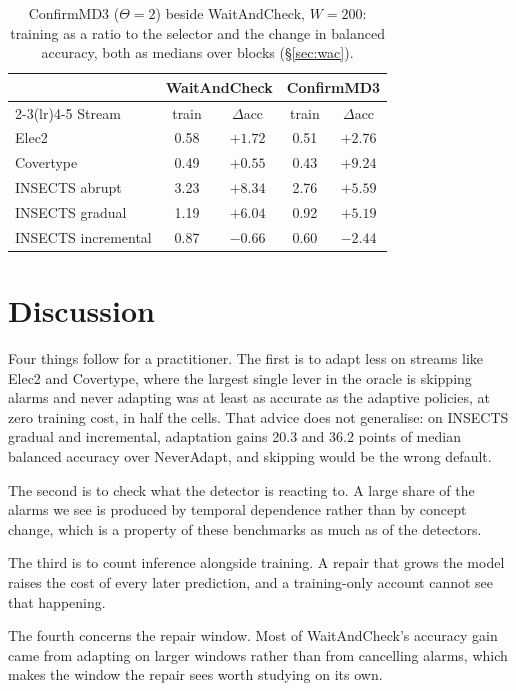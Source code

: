 \documentclass[conference]{IEEEtran}
\begin{document}
\begin{table}[t]
\caption{ConfirmMD3 ($\Theta=2$) beside WaitAndCheck, $W=200$: training as a
ratio to the selector and the change in balanced accuracy, both as medians over
blocks (\S\ref{sec:wac}).}
\label{tab:md3}
\centering\small
\begin{tabular}{lcccc}
\toprule
& \multicolumn{2}{c}{WaitAndCheck} & \multicolumn{2}{c}{ConfirmMD3} \\
\cmidrule(lr){2-3}\cmidrule(lr){4-5}
Stream & train & $\Delta$acc & train & $\Delta$acc \\
\midrule
Elec2 & 0.58 & $+1.72$ & 0.51 & $+2.76$ \\
Covertype & 0.49 & $+0.55$ & 0.43 & $+9.24$ \\
INSECTS abrupt & 3.23 & $+8.34$ & 2.76 & $+5.59$ \\
INSECTS gradual & 1.19 & $+6.04$ & 0.92 & $+5.19$ \\
INSECTS incremental & 0.87 & $-0.66$ & 0.60 & $-2.44$ \\
\bottomrule
\end{tabular}
\end{table}

\section{Discussion}

Four things follow for a practitioner. The first is to adapt less on streams like
Elec2 and Covertype, where the largest single lever in the oracle is skipping
alarms and never adapting was at least as accurate as the adaptive policies, at
zero training cost, in half the cells. That advice does not generalise: on
INSECTS gradual and incremental, adaptation gains 20.3 and 36.2 points of median
balanced accuracy over NeverAdapt, and skipping would be the wrong default.

The second is to check what the detector is reacting to. A large share of the
alarms we see is produced by temporal dependence rather than by concept change,
which is a property of these benchmarks as much as of the detectors.

The third is to count inference alongside training. A repair that grows the model
raises the cost of every later prediction, and a training-only account cannot see
that happening.

The fourth concerns the repair window. Most of WaitAndCheck's accuracy gain came
from adapting on larger windows rather than from cancelling alarms, which makes
the window the repair sees worth studying on its own.
\end{document}
